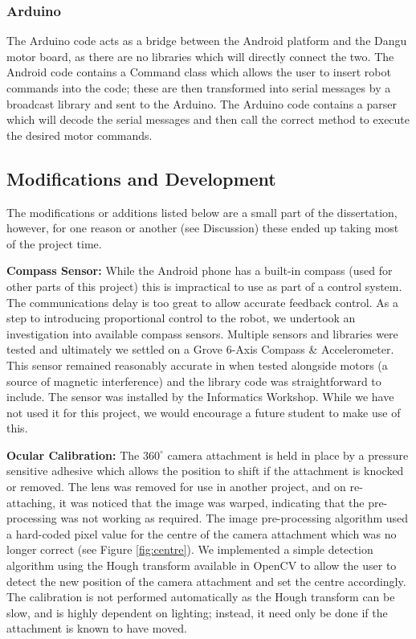 \documentclass[a4paper,11pt,twoside,openright]{article}
\begin{document}
\subsubsection{ Arduino }
The Arduino code acts as a bridge between the Android platform and the Dangu
motor board, as there are no libraries which will directly connect the two.
The Android code contains a Command class which allows the user to insert robot
commands into the code; these are then transformed into serial messages by a
broadcast library \cite{Eberding2016} and sent to the Arduino. The Arduino code
contains a parser which will decode the serial messages and then call the
correct method to execute the desired motor commands.

\subsection{ Modifications and Development }\label{sec:mod}
The modifications or additions listed below are a small part of the dissertation,
however, for one reason or another (see Discussion) these ended up taking
most of the project time.

\textbf{Compass Sensor:}
While the Android phone has a built-in compass (used for other parts of this
project) this is impractical to use as part of a control system. The
communications delay is too great to allow accurate feedback control.
As a step to introducing proportional control to the robot, we undertook an
investigation into available compass sensors. Multiple sensors and libraries
were tested and ultimately we settled on a Grove 6-Axis Compass \& Accelerometer.
This sensor remained reasonably accurate in when tested alongside motors (a
source of magnetic interference) and the library code was straightforward to
include. The sensor was installed by the Informatics Workshop. While we have not
used it for this project, we would encourage a future student to make use of
this.
\newline
\par

\textbf{Ocular Calibration:}
The $360^{\circ}$ camera attachment is held in place by a pressure sensitive
adhesive which allows the position to shift if the attachment is knocked or
removed. The lens was removed for use in another project, and on re-attaching, it
was noticed that the image was warped, indicating that the pre-processing was not
working as required. The image pre-processing algorithm used a hard-coded pixel
value for the centre of the camera attachment which was no longer correct
(see Figure \ref{fig:centre}). We implemented a simple detection
algorithm using the Hough transform available in OpenCV to allow the user
to detect the new position of the camera attachment and set the centre
accordingly. The calibration is not performed automatically as the Hough
transform can be slow, and is highly dependent on lighting; instead, it
need only be done if the attachment is known to have moved.
\newline
\par
\end{document}
